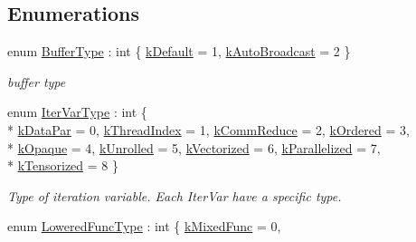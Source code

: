 \subsection*{Enumerations}
\begin{DoxyCompactItemize}
\item 
enum \hyperlink{namespacetvm_1_1tir_a9ac05a14db42ca73da1d3945e7ce2fd1}{Buffer\+Type} \+: int \{ \hyperlink{namespacetvm_1_1tir_a9ac05a14db42ca73da1d3945e7ce2fd1a4500370408bf0077c86a795cbe9dbf39}{k\+Default} = 1, 
\hyperlink{namespacetvm_1_1tir_a9ac05a14db42ca73da1d3945e7ce2fd1a08cd53d61aa635081a2f7a0597025663}{k\+Auto\+Broadcast} = 2
 \}\begin{DoxyCompactList}\small\item\em buffer type \end{DoxyCompactList}
\item 
enum \hyperlink{namespacetvm_1_1tir_add7d0a6b1dd91f0c3c5dd2f4cf64358e}{Iter\+Var\+Type} \+: int \{ \\*
\hyperlink{namespacetvm_1_1tir_add7d0a6b1dd91f0c3c5dd2f4cf64358ea943fcb20375772edb59ea948f6cc9422}{k\+Data\+Par} = 0, 
\hyperlink{namespacetvm_1_1tir_add7d0a6b1dd91f0c3c5dd2f4cf64358ea2758d2f7912af847eff77105023a25d0}{k\+Thread\+Index} = 1, 
\hyperlink{namespacetvm_1_1tir_add7d0a6b1dd91f0c3c5dd2f4cf64358eac78682fe1cb0a6de8511f2fc5144c0b4}{k\+Comm\+Reduce} = 2, 
\hyperlink{namespacetvm_1_1tir_add7d0a6b1dd91f0c3c5dd2f4cf64358eaba48cf32065b1bf9086138313912f64b}{k\+Ordered} = 3, 
\\*
\hyperlink{namespacetvm_1_1tir_add7d0a6b1dd91f0c3c5dd2f4cf64358eaf324873e6195114a186db7f910559b2c}{k\+Opaque} = 4, 
\hyperlink{namespacetvm_1_1tir_add7d0a6b1dd91f0c3c5dd2f4cf64358ea37ab325f4c3ab1d2a905cbfe546bc403}{k\+Unrolled} = 5, 
\hyperlink{namespacetvm_1_1tir_add7d0a6b1dd91f0c3c5dd2f4cf64358ea1d03c8fa5be7edb0032b8155736239bd}{k\+Vectorized} = 6, 
\hyperlink{namespacetvm_1_1tir_add7d0a6b1dd91f0c3c5dd2f4cf64358eae12eb286fbc36da6dd2e4775a1306652}{k\+Parallelized} = 7, 
\\*
\hyperlink{namespacetvm_1_1tir_add7d0a6b1dd91f0c3c5dd2f4cf64358ea772fdb24758cfac34cb164be343abb47}{k\+Tensorized} = 8
 \}\begin{DoxyCompactList}\small\item\em Type of iteration variable. Each Iter\+Var have a specific type. \end{DoxyCompactList}
\item 
enum \hyperlink{namespacetvm_1_1tir_a69f0089a367b98e377b652186fa7dc66}{Lowered\+Func\+Type} \+: int \{ \hyperlink{namespacetvm_1_1tir_a69f0089a367b98e377b652186fa7dc66accd368fda1b61f733343349a79cf2ca9}{k\+Mixed\+Func} = 0, 

\end{DoxyCompactItemize}
